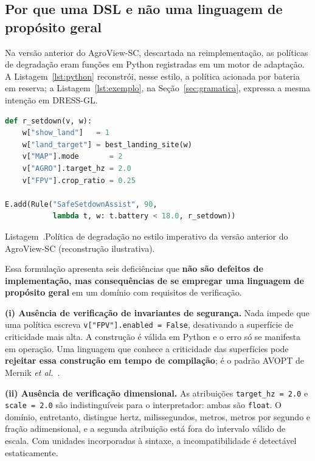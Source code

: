 \documentclass[conference]{IEEEtran}
\renewcommand{\lstlistingname}{Listagem}
\newenvironment{blocolst}%
  {\par\medskip\noindent\begin{minipage}{\columnwidth}}%
  {\end{minipage}\par\medskip}
\newcommand{\legendalst}[2]{%
  \par\vspace{2pt}%
  \refstepcounter{lstlisting}\label{#1}%
  {\footnotesize\lstlistingname~\thelstlisting.\enspace #2\par}}
\begin{document}
\subsection{Por que uma DSL e não uma linguagem de propósito geral}
\label{sec:relevancia}

Na versão anterior do AgroView-SC, descartada na reimplementação, as políticas
de degradação eram funções em Python registradas em um motor de adaptação. A
Listagem~\ref{lst:python} reconstrói, nesse estilo, a política acionada por
bateria em reserva; a Listagem~\ref{lst:exemplo}, na
Seção~\ref{sec:gramatica}, expressa a mesma intenção em DRESS-GL.

\begin{blocolst}
\begin{lstlisting}[language=Python]
def r_setdown(v, w):
    w["show_land"]   = 1
    w["land_target"] = best_landing_site(w)
    v["MAP"].mode       = 2
    v["AGRO"].target_hz = 2.0
    v["FPV"].crop_ratio = 0.25

E.add(Rule("SafeSetdownAssist", 90,
           lambda t, w: t.battery < 18.0, r_setdown))
\end{lstlisting}
\legendalst{lst:python}{Política de degradação no estilo imperativo da versão
anterior do AgroView-SC (reconstrução ilustrativa).}
\end{blocolst}

Essa formulação apresenta seis deficiências que \textbf{não são defeitos de
implementação, mas consequências de se empregar uma linguagem de propósito
geral} em um domínio com requisitos de verificação.

\textbf{(i) Ausência de verificação de invariantes de segurança.} Nada impede
que uma política escreva \texttt{v["FPV"].enabled = False}, desativando a
superfície de criticidade mais alta. A construção é válida em Python e o erro
só se manifesta em operação. Uma linguagem que conhece a criticidade das
superfícies pode \textbf{rejeitar essa construção em tempo de compilação}; é o
padrão AVOPT de Mernik \textit{et al.}~\cite{mernik2005}.

\textbf{(ii) Ausência de verificação dimensional.} As atribuições
\texttt{target\_hz = 2.0} e \texttt{scale = 2.0} são indistinguíveis para o
interpretador: ambas são \texttt{float}. O domínio, entretanto, distingue
hertz, milissegundos, metros, metros por segundo e fração adimensional, e a
segunda atribuição está fora do intervalo válido de escala. Com unidades
incorporadas à sintaxe, a incompatibilidade é detectável estaticamente.
\end{document}
